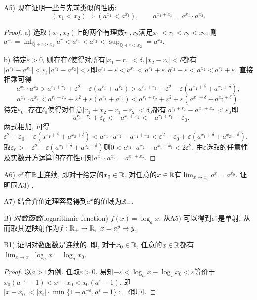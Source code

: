 \vspace{0.5em}
A5) 现在证明一些与先前类似的性质: 
$$(x_1 < x_2) \Rightarrow (a^{x_1} < a^{x_2}), \qquad a^{x_1+x_2} = a^{x_1} \cdot a^{x_2}.$$

\begin{proof}
	a) 选取$(x_1,x_2)$上的两个有理数$r_1,r_2$满足$x_1<r_1<r_2<x_2$, 则$a^{x_1} = \inf_{\mathbb{Q} \ni r > x_1} a^r < a^{r_1} < a^{r_2} < \sup_{\mathbb{Q} \ni r < x_2}=a^{x_2}$.
	
	b) 待定$\varepsilon >0$, 则存在$\delta$使得对所有$|x_1-r_1|<\delta ,|x_2-r_2|<\delta$都有$|a^{r_1}-a^{x_1}|<\varepsilon ,|a^{r_2}-a^{x_2}|<\varepsilon$即$a^{r_1}-\varepsilon < a^{x_1} < a^{r_1} + \varepsilon , a^{r_2}-\varepsilon < a^{x_2} < a^{r_2} + \varepsilon$. 直接相乘可得$$a^{x_1} \cdot a^{x_2} > a^{r_1+r_2}+\varepsilon ^2 - \varepsilon (a^{r_1}+a^{r_2}) > a^{r_1+r_2}+\varepsilon ^2 - \varepsilon (a^{x_1+\delta}+a^{x_2+\delta}),$$
		$$a^{x_1} \cdot a^{x_2} < a^{r_1+r_2}+\varepsilon ^2 + \varepsilon (a^{r_1}+a^{r_2}) < a^{r_1+r_2}+\varepsilon ^2 + \varepsilon (a^{x_1+\delta}+a^{x_2+\delta}).$$
	待定$\varepsilon _0$, 存在$\delta _0$使得对任意$|x_1+x_2-r_1-r_2|<\delta _0$都有$|a^{r_1+r_2} - a^{x_1+x_2}|<\varepsilon _0$即$$-a^{r_1+r_2} + \varepsilon _0 < -a^{x_1+x_2} < -a^{r_1+r_2} - \varepsilon _0.$$
	两式相加, 可得$\varepsilon ^2+\varepsilon _0 - \varepsilon (a^{x_1+\delta}+a^{x_2+\delta}) < a^{x_1} \cdot a^{x_2} - a^{x_1+x_2} < \varepsilon ^2 -\varepsilon _0 + \varepsilon (a^{x_1+\delta}+a^{x_2+\delta})$. 取$\varepsilon _0 > -\varepsilon ^2 + \varepsilon (a^{x_1+\delta}+a^{x_2+\delta})$则$0 < a^{x_1} \cdot a^{x_2} - a^{x_1+x_2} < 2\varepsilon ^2$. 由$\varepsilon$选取的任意性及实数开方运算的存在性可知$a^{x_1} \cdot a^{x_2} = a^{x_1+x_2}$. 
\end{proof}

A6) $a^x$在$\mathbb{R}$上连续, 即对于给定的$x_0 \in \mathbb{R}$, 对任意的$x \in \mathbb{R}$有$\lim_{x \to x_0} a^x = a^{x_0}$. 证明同A3) .

A7) 结合介值定理容易得到$a^x$的值域为$\mathbb{R} _+$.

\vspace{1em}
B) \textit{对数函数}(logarithmic function) $f(x)=\log_a{x}$. 从A5) 可以得到$a^x$是单射, 从而取其逆映射作为$f:\mathbb{R} _+ \to \mathbb{R} ,~x=a^y \mapsto y$.

B1) 证明对数函数是连续的. 即, 对于$x_0 \in \mathbb{R}$, 任意的$x \in \mathbb{R}$都有$\lim_{x \to x_0} \log_a{x} = \log_a{x_0}$. 

\begin{proof}
	以$a>1$为例. 任取$\varepsilon >0$. 易知$-\varepsilon < \log_a{x} - \log_a{x_0} < \varepsilon$等价于$x_0(a^{-\varepsilon}-1) < x-x_0 < x_0(a^{\varepsilon}-1)$, 即$|x-x_0|<|x_0| \cdot \min \{ 1-a^{-\varepsilon},a^{\varepsilon}-1 \} :=\delta$即可. 
\end{proof}

